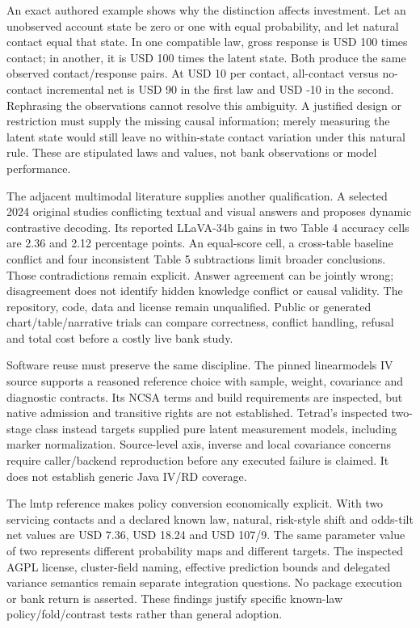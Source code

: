An exact authored example shows why the distinction affects investment.
Let an unobserved account state be zero or one with equal probability,
and let natural contact equal that state. In one compatible law, gross
response is USD 100 times contact; in another, it is USD 100 times the
latent state. Both produce the same observed contact/response pairs. At
USD 10 per contact, all-contact versus no-contact incremental net is USD
90 in the first law and USD -10 in the second. Rephrasing the
observations cannot resolve this ambiguity. A justified design or
restriction must supply the missing causal information; merely measuring
the latent state would still leave no within-state contact variation
under this natural rule. These are stipulated laws and values, not bank
observations or model performance. \citep{exec23_context_reference}

The adjacent multimodal literature supplies another qualification. A
selected 2024 original studies conflicting textual and visual answers
and proposes dynamic contrastive decoding. Its reported LLaVA-34b gains
in two Table 4 accuracy cells are 2.36 and 2.12 percentage points. An
equal-score cell, a cross-table baseline conflict and four inconsistent
Table 5 subtractions limit broader conclusions. Those contradictions
remain explicit. Answer agreement can be jointly wrong; disagreement
does not identify hidden knowledge conflict or causal validity. The
repository, code, data and license remain unqualified. Public or
generated chart/table/narrative trials can compare correctness, conflict
handling, refusal and total cost before a costly live bank study.
\citep{exec23_cross_modality_conflict,exec23_context_reference}

Software reuse must preserve the same discipline. The pinned
linearmodels IV source supports a reasoned reference choice with sample,
weight, covariance and diagnostic contracts. Its NCSA terms and build
requirements are inspected, but native admission and transitive rights
are not established. Tetrad's inspected two-stage class instead targets
supplied pure latent measurement models, including marker normalization.
Source-level axis, inverse and local covariance concerns require
caller/backend reproduction before any executed failure is claimed. It
does not establish generic Java IV/RD coverage.
\citep{exec22_linearmodels_reuse,exec22_java_latent_iv_preflight}

The lmtp reference makes policy conversion economically explicit. With
two servicing contacts and a declared known law, natural, risk-style
shift and odds-tilt net values are USD 7.36, USD 18.24 and USD 107/9.
The same parameter value of two represents different probability maps
and different targets. The inspected AGPL license, cluster-field naming,
effective prediction bounds and delegated variance semantics remain
separate integration questions. No package execution or bank return is
asserted. These findings justify specific known-law policy/fold/contrast
tests rather than general adoption.
\citep{exec22_lmtp_reuse,exec23_policy_reference}

